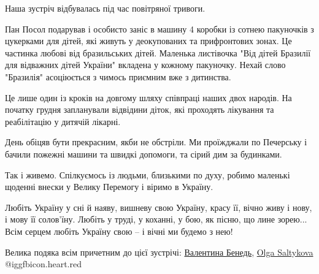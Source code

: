 Наша зустріч відбувалась під час повітряної тривоги.

Пан Посол подарував і особисто заніс в машину 4 коробки із сотнею пакуночків з
цукерками для дітей, які живуть у деокупованих та прифронтових зонах. Це
частинка любові від бразильських дітей. Маленька листівочка "Від дітей Бразилії
для відважних дітей України" вкладена у кожному пакуночку. Нехай слово
"Бразилія" асоціюється з чимось приємним вже з дитинства.

Це лише один із кроків на довгому шляху співпраці наших двох народів. На
початку грудня запланували відвідини діток, які проходять лікування  та
реабілітацію у  дитячій лікарні. 

День обіцяв бути прекрасним, якби не обстріли. Ми проїжджали по Печерську і
бачили пожежні машини та швидкі допомоги, та сірий дим за будинками. 

Так і живемо. Спілкуємось із людьми, близькими по духу, робимо маленькі щоденні
внески у Велику Перемогу і віримо в Україну. 

\obeycr
Любіть Україну у сні й наяву,
вишневу свою Україну,
красу її, вічно живу і нову,
і мову її солов'їну.
Любіть у труді, у коханні, у бою,
як пісню, що лине зорею...
Всім серцем любіть Україну свою -- 
і вічні ми будемо з нею!
\restorecr

Велика подяка всім причетним до цієї зустрічі: \href{https://www.facebook.com/profile.php?id=100000946332209}{Валентина Бенедь}, 
\href{https://www.facebook.com/olga.mysholov}{Olga Saltykova}
@igg{fbicon.heart.red}


